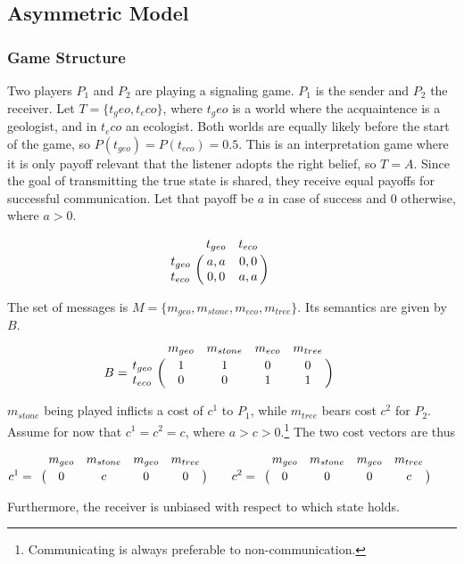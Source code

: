 \documentclass[10]{article}
\begin{document}
\subsection{Asymmetric Model}
\subsubsection{Game Structure}
Two players $P_1$ and $P_2$ are playing a signaling game. $P_1$ is the sender and $P_2$ the receiver.
Let $T=\{t_geo, t_eco\}$, where $t_geo$ is a world where the acquaintence is a geologist, and in $t_eco$ an ecologist. Both worlds are equally likely before the start of the game, so $P(t_{geo})=P(t_{eco})=0.5$. This is an interpretation game where it is only payoff relevant that the listener adopts the right belief, so $T=A$. Since the goal of transmitting the true state is shared, they receive equal payoffs for successful communication. Let that payoff be $a$ in case of success and 0 otherwise, where $a>0$.

\begin{equation*}
\bordermatrix{
      & t_{geo} & t_{eco}    \cr
  t_{geo} & a,a & 0,0  \cr
  t_{eco} & 0,0 & a,a
}\qquad
\end{equation*}

The set of messages is $M=\{m_{geo}, m_{stone}, m_{eco}, m_{tree}\}$. Its semantics are given by $B$.
 \begin{equation*}
 B =
 \bordermatrix{
            & m_{geo} & m_{stone} & m_{eco} & m_{tree}    \cr
   t_{geo}  &       1 &         1 & 0       & 0 \cr
   t_{eco}  &       0 &         0 & 1       & 1
 }\qquad
 \end{equation*}

$m_{stone}$ being played inflicts a cost of $c^1$ to $P_1$, while $m_{tree}$ bears cost $c^2$ for $P_2$. Assume for now that $c^1=c^2=c$, where $a>c>0$.\footnote{Communicating is always preferable to non-communication.} The two cost vectors are thus

  \begin{equation*}
  c^1 =
  \bordermatrix{
             & m_{geo} & m_{stone} & m_{geo} & m_{tree}    \cr
             &       0 &         c & 0       & 0
  }\qquad
  c^2 =
    \bordermatrix{
               & m_{geo} & m_{stone} & m_{geo} & m_{tree}    \cr
               &       0 &         0 & 0       & c
    }\qquad
  \end{equation*}

Furthermore, the receiver is unbiased with respect to which state holds.
\end{document}
